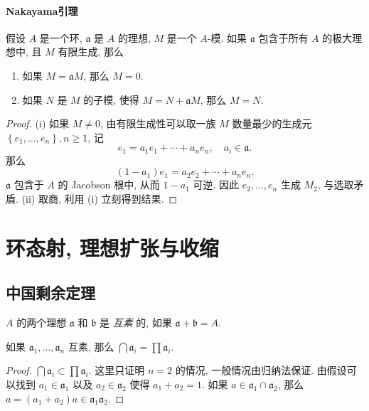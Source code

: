 \paragraph{Nakayama引理}

\begin{theorem}[Nakayama引理]
  \label{theorem-Nakayama-lemma}
  假设 \( A \) 是一个环, \( \mathfrak{a} \) 是 \( A \) 的理想, \( M \) 是一个 \(
  A\)-模. 如果 \( \mathfrak{a} \) 包含于所有 \( A \) 的极大理想中, 且 \( M \)
  有限生成, 那么
  \begin{enumerate}
    \item 如果 \( M = \mathfrak{a} M \), 那么 \( M = 0 \).
    \item 如果 \( N \) 是 \( M \) 的子模, 使得 \( M = N + \mathfrak{a} M \),
      那么 \( M = N \).
  \end{enumerate}
\end{theorem}
\begin{proof}
  (i) 如果 \( M \neq 0 \), 由有限生成性可以取一族 \( M \) 数量最少的生成元 \(
  \left\lbrace e_1, \ldots, e_n \right\rbrace, n \geq 1 \), 记
  \[
    e_1 = a_1 e_1 + \cdots + a_n e_n,\quad a_i \in \mathfrak{a}.
  \]
  那么
  \[
    (1 - a_1) e_1 = a_2 e_2 + \cdots + a_n e_n.
  \]
  \( \mathfrak{a} \) 包含于 \( A \) 的 Jacobson 根中, 从而 \( 1 - a_1 \) 可逆.
  因此 \( e_2, \ldots, e_n \) 生成 \( M_2 \), 与选取矛盾. (ii) 取商, 利用 (i)
  立刻得到结果.
\end{proof}

\section{环态射, 理想扩张与收缩}

\subsection{中国剩余定理}

\( A \) 的两个理想 \( \mathfrak{a} \) 和 \( \mathfrak{b} \) 是 \emph{互素} 的,
如果 \( \mathfrak{a} + \mathfrak{b} = A \).
\begin{proposition}
  如果 \( \mathfrak{a}_1,\ldots, \mathfrak{a}_n \) 互素, 那么 \( \bigcap
  \mathfrak{a}_i = \prod \mathfrak{a}_i \).
\end{proposition}
\begin{proof}
  \( \bigcap \mathfrak{a}_i \subset \prod \mathfrak{a}_i \).
  这里只证明 \( n = 2 \) 的情况, 一般情况由归纳法保证.
  由假设可以找到 \( a_1 \in \mathfrak{a}_1 \) 以及 \( a_2 \in \mathfrak{a}_2 \)
  使得 \( a_1 + a_2 = 1 \). 如果 \( a \in \mathfrak{a}_1 \cap \mathfrak{a}_2 \),
  那么 \( a = (a_1 + a_2)a \in \mathfrak{a}_1 \mathfrak{a}_2 \).
\end{proof}

